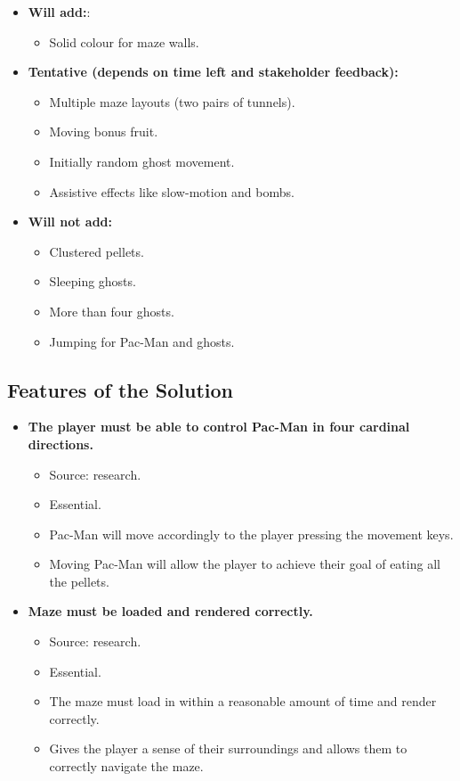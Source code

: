 \documentclass[letterpaper, 11pt]{article}
\begin{document}
\begin{itemize}
\item \textbf{Will add:}:
\begin{itemize}
\item Solid colour for maze walls.
\end{itemize}

\item \textbf{Tentative (depends on time left and stakeholder feedback):}
\begin{itemize}
\item Multiple maze layouts (two pairs of tunnels).
\item Moving bonus fruit.
\item Initially random ghost movement.
\item Assistive effects like slow-motion and bombs.
\end{itemize}

\item \textbf{Will not add:}
\begin{itemize}
\item Clustered pellets.
\item Sleeping ghosts.
\item More than four ghosts.
\item Jumping for Pac-Man and ghosts.
\end{itemize}
\end{itemize}

\subsection{Features of the Solution}
\label{sec:org71951a5}
\begin{itemize}
\item \textbf{The player must be able to control Pac-Man in four cardinal directions.}
\begin{itemize}
\item Source: research.
\item Essential.
\item Pac-Man will move accordingly to the player pressing the movement keys.
\item Moving Pac-Man will allow the player to achieve their goal of eating all the pellets.
\end{itemize}
\end{itemize}


\begin{itemize}
\item \textbf{Maze must be loaded and rendered correctly.}
\begin{itemize}
\item Source: research.
\item Essential.
\item The maze must load in within a reasonable amount of time and render correctly.
\item Gives the player a sense of their surroundings and allows them to correctly navigate the maze.
\end{itemize}
\end{itemize}
\end{document}
